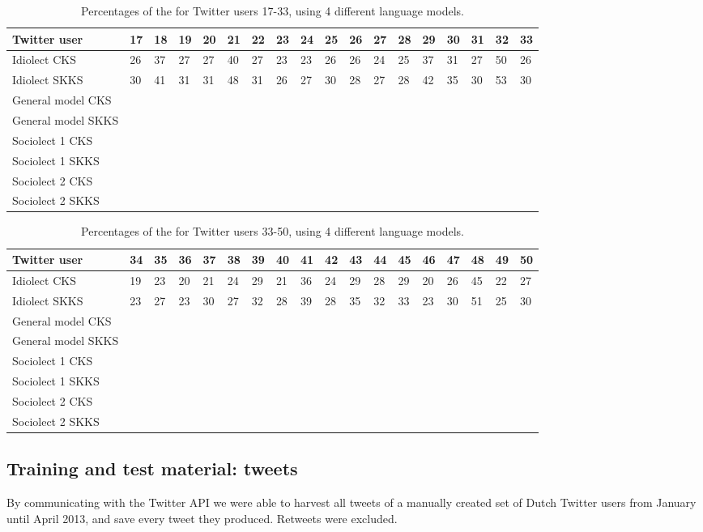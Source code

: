 \documentclass[11pt]{article}
\begin{document}
\begin{table*}[t]
\begin{tabular}{l|*{17}{l}}
Twitter user&17&18&19&20&21&22&23&24&25&26&27&28&29&30&31&32&33\\
\hline
Idiolect CKS&26&37&27&27&40&27&23&23&26&26&24&25&37&31&27&50&26\\
Idiolect SKKS&30&41&31&31&48&31&26&27&30&28&27&28&42&35&30&53&30\\
\hline
General model CKS\\
General model SKKS\\
\hline
Sociolect 1 CKS\\
Sociolect 1 SKKS\\
\hline
Sociolect 2 CKS\\
Sociolect 2 SKKS\\
\end{tabular}
\caption{Percentages of the for Twitter users 17-33, using 4 different language models.}
\label{result2}
\end{table*}

\begin{table*}[t]
\begin{tabular}{l|*{17}{l}}
Twitter user&34&35&36&37&38&39&40&41&42&43&44&45&46&47&48&49&50\\
\hline
Idiolect CKS&19&23&20&21&24&29&21&36&24&29&28&29&20&26&45&22&27\\
Idiolect SKKS&23&27&23&30&27&32&28&39&28&35&32&33&23&30&51&25&30\\
\hline
General model CKS\\
General model SKKS\\
\hline
Sociolect 1 CKS\\
Sociolect 1 SKKS\\
\hline
Sociolect 2 CKS\\
Sociolect 2 SKKS\\
\end{tabular}
\label{result3}
\caption{Percentages of the for Twitter users 33-50, using 4 different language models.}
\end{table*}


\subsection{Training and test material: tweets}

By communicating with the Twitter API we were able to harvest all tweets of a manually created set of Dutch Twitter users from January until April 2013, and save every tweet they produced. Retweets were excluded.
\end{document}

